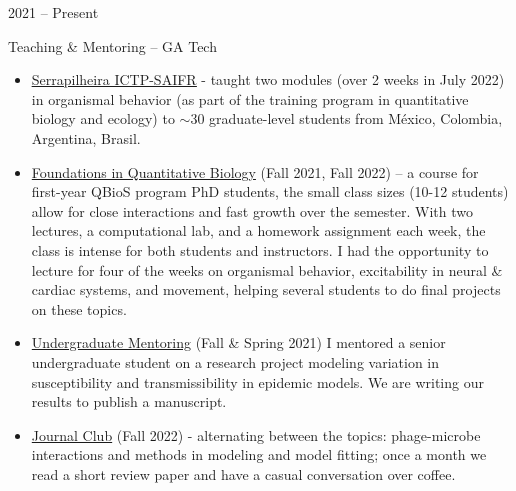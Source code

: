 \documentclass[a4paper,10pt]{article}
\newlength{\cvcolumngapwidth}
\newlength{\cvleftcolumnwidth}
\newlength{\cvrightcolumnwidth}
\newcommand{\cvtitlestyle}[1]{{\large\cvtitlefont\textcolor{cvtitlecolor}{#1}}}
\newcommand{\cvdurationstyle}[1]{{\small\cvdurationfont\textcolor{cvdurationcolor}{#1}}}
\newcommand{\cvheadingstyle}[1]{{\normalsize\cvheadingfont\textcolor{cvheadingcolor}{#1}}}
\newlength{\cvafteritemskipamount}
\newlength{\cvaftertitleskipamount}
\newlength{\cvparskip}
\newcommand{\cvitem}[2]{
            \begin{minipage}[t]{\cvleftcolumnwidth}
                \raggedleft #1
            \end{minipage}%
            \hspace{\cvcolumngapwidth}%
            \begin{minipage}[t]{\cvrightcolumnwidth}
                \setlength{\parskip}{\cvparskip} #2
            \end{minipage}
        
            \vspace{\cvafteritemskipamount}
        }
\newcommand{\cvtitle}[1]{
            \cvtitlestyle{#1}
        
            \vspace{\cvaftertitleskipamount}
            \vspace{-\cvparskip}
        }
\begin{document}
	\cvitem{
            \cvheadingstyle{2021 -- Present}
        }{
            \cvtitle{Teaching \& Mentoring -- GA Tech}
            \begin{itemize}[leftmargin=*]
            	\item \href{https://docs.google.com/spreadsheets/d/1vShFs_Td_geBw8N3Ll6b7dOMDl3bdHjoqBhE8TupWd4/edit?usp=sharing}{\underline{Serrapilheira ICTP-SAIFR}} -  taught two modules (over 2 weeks in July 2022) in organismal behavior (as part of the training program in quantitative biology and ecology) to $\sim$30 graduate-level students from M\'exico, Colombia, Argentina, Brasil.
                \item \underline{Foundations in Quantitative Biology} (Fall 2021, Fall 2022) -- a course for first-year QBioS program PhD students, the small class sizes (10-12 students) allow for close interactions and fast growth over the semester. With two lectures, a computational lab, and a homework assignment each week, the class is intense for both students and instructors. I had the opportunity to lecture for four of the weeks on organismal behavior, excitability in neural \& cardiac systems, and movement, helping several students to do final projects on these topics.
		\item  \underline{Undergraduate Mentoring} (Fall \& Spring 2021) I mentored a senior undergraduate student on a research project modeling variation in susceptibility and transmissibility in epidemic models. We are writing our results to publish a manuscript. 
		               \item \href{https://docs.google.com/spreadsheets/d/1vShFs_Td_geBw8N3Ll6b7dOMDl3bdHjoqBhE8TupWd4/edit?usp=sharing}{Journal Club} (Fall 2022) - alternating between the topics: phage-microbe interactions and methods in modeling and model fitting; once a month we read a short review paper and have a casual conversation over coffee.
%        


\end{itemize}}
\end{document}
